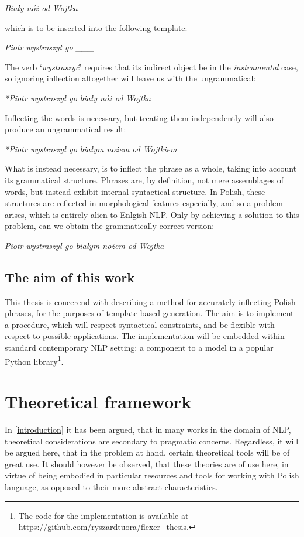 \documentclass[12pt]{article}
\newcommand{\gloss}[1]{\vspace{10pt}\indent\textit{#1}\vspace{5pt}}
\newcommand{\inlinegloss}[1]{`\textit{#1}'}
\newcommand{\gap}{\_\_\_}
\begin{document}
\gloss{Biały nóż od Wojtka}

which is to be inserted into the following template:

\gloss{Piotr wystraszył go \gap}

The verb \inlinegloss{wystraszyć} requires that its indirect object be in the \textit{instrumental} case, so ignoring inflection altogether will leave us with the ungrammatical:

\gloss{*Piotr wystraszył go biały nóż od Wojtka}

Inflecting the words is necessary, but treating them independently will also produce an ungrammatical result:

\gloss{*Piotr wystraszył go białym nożem od Wojtkiem}

What is instead necessary, is to inflect the phrase as a whole, taking into account its grammatical structure. Phrases are, by definition, not mere assemblages of words, but instead exhibit internal syntactical structure. In Polish, these structures are reflected in morphological features especially, and so a problem arises, which is entirely alien to Enlgish NLP. Only by achieving a solution to this problem, can we obtain the grammatically correct version:

\gloss{Piotr wystraszył go białym nożem od Wojtka}

\subsection{The aim of this work}
This thesis is concerend with describing a method for accurately inflecting Polish phrases, for the purposes of template based generation. The aim is to implement a procedure, which will respect syntactical constraints, and be flexible with respect to possible applications. The implementation will be embedded within standard contemporary NLP setting: a component to a model in a popular Python library\footnote{The code for the implementation is available at \url{https://github.com/ryszardtuora/flexer_thesis}.}. 


\section{Theoretical framework}
\label{theoretical framework}
In \autoref{introduction} it has been argued, that in many works in the domain of NLP, theoretical considerations are secondary to pragmatic concerns. Regardless, it will be argued here, that in the problem at hand, certain theoretical tools will be of great use. It should however be observed, that these theories are of use here, in virtue of being embodied in particular resources and tools for working with Polish language, as opposed to their more abstract characteristics.
\end{document}
